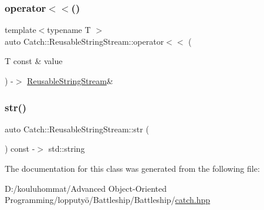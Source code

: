 \mbox{\label{class_catch_1_1_reusable_string_stream_af95f72024c082db70e5e50782e28e4f6}} 
\subsubsection{\texorpdfstring{operator$<$$<$()}{operator<<()}}
{\footnotesize\ttfamily template$<$typename T $>$ \\
auto Catch\+::\+Reusable\+String\+Stream\+::operator$<$$<$ (\begin{DoxyParamCaption}\item[{T const \&}]{value }\end{DoxyParamCaption}) -\/$>$ \mbox{\hyperlink{class_catch_1_1_reusable_string_stream}{Reusable\+String\+Stream}}\& \hspace{0.3cm}{\ttfamily [inline]}}

\mbox{\label{class_catch_1_1_reusable_string_stream_a0e9ecf260b2a5d35f4886ef0d51f6270}} 
\subsubsection{\texorpdfstring{str()}{str()}}
{\footnotesize\ttfamily auto Catch\+::\+Reusable\+String\+Stream\+::str (\begin{DoxyParamCaption}{ }\end{DoxyParamCaption}) const -\/$>$  std\+::string}



The documentation for this class was generated from the following file\+:\begin{DoxyCompactItemize}
\item 
D\+:/kouluhommat/\+Advanced Object-\/\+Oriented Programming/lopputyö/\+Battleship/\+Battleship/\mbox{\hyperlink{catch_8hpp}{catch.\+hpp}}\end{DoxyCompactItemize}
